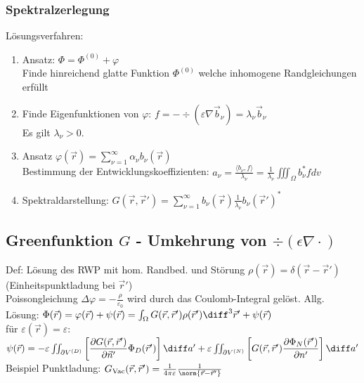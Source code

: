 \subsubsection{Spektralzerlegung}
Lösungsverfahren:\\
\begin{enumerate}
      \item Ansatz: $\Phi = \Phi^{(0)} + \varphi$\\
            Finde hinreichend glatte Funktion $\Phi^{(0)}$ welche inhomogene Randgleichungen erfüllt
      \item Finde Eigenfunktionen von $\varphi$: $f=-\div(\varepsilon \nabla \vec b_\nu) = \lambda_\nu \vec b_\nu$\\
            Es gilt $\lambda_\nu > 0$.
      \item Ansatz $\varphi(\vec r) = \sum_{\nu = 1}^\infty \alpha_\nu b_\nu(\vec r)$\\
            Bestimmung der Entwicklungskoeffizienten: $a_\nu = \frac{\langle b_\nu,f\rangle}{\lambda_\nu} = \frac{1}{\lambda_\nu}\iiint_\Omega b_\nu^* f dv$\\
      \item Spektraldarstellung: $G(\vec r, \vec r') = \sum_{\nu = 1}^\infty b_\nu (\vec r) \frac{1}{\lambda_\nu} b_\nu (\vec r')^*$\\
\end{enumerate}



\subsection{Greenfunktion $G$ - Umkehrung von $\div(\epsilon \nabla\cdot)$}
Def: Lösung des RWP mit hom. Randbed. und Störung $\rho(\vec r) = \delta(\vec r - \vec r')$ (Einheitspunktladung bei $\vec r'$)\\
Poissongleichung $\Delta\varphi = -\frac{\rho}{\varepsilon_0}$ wird durch das Coulomb-Integral gelöst.
Allg. Lösung: $\Phi(\vec r) = \varphi(\vec r)+\psi(\vec r) = \int_\Omega G(\vec r, \vec r')\rho(\vec r') \diff^3 \vec r' + \psi(\vec r)$\\
für $\varepsilon(\vec r) = \varepsilon$: $\psi(\vec r) = -\varepsilon\iint_{\partial V^{(D)}}\left[\dfrac{\partial G(\vec r, \vec r')}{\partial\vec n'}\Phi_D(\vec r')\right]\diff a'+\varepsilon\iint_{\partial V^{(N)}}\left[G(\vec r, \vec r')\dfrac{\partial\Phi_N(\vec r')}{\partial n'}\right]\diff a'$
\\
Beispiel Punktladung: $G_{\text{Vac}}(\vec r, \vec r') = \frac{1}{4 \pi \varepsilon} \frac{1}{\norm{\vec r - \vec r'}}$

